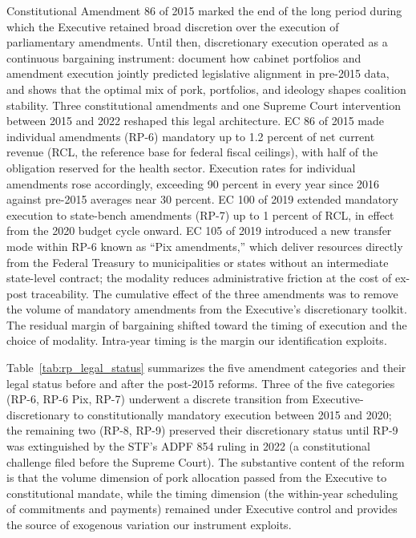 \documentclass[pdflatex,sn-basic]{sn-jnl}
\begin{document}
Constitutional Amendment 86 of 2015 marked the end of the long period during which the Executive retained broad discretion over the execution of parliamentary amendments. Until then, discretionary execution operated as a continuous bargaining instrument: \citet{PereiraAndMueller2004} document how cabinet portfolios and amendment execution jointly predicted legislative alignment in pre-2015 data, and \citet{Raile2011} shows that the optimal mix of pork, portfolios, and ideology shapes coalition stability. Three constitutional amendments and one Supreme Court intervention between 2015 and 2022 reshaped this legal architecture. EC 86 of 2015 made individual amendments (RP-6) mandatory up to 1.2 percent of net current revenue (RCL, the reference base for federal fiscal ceilings), with half of the obligation reserved for the health sector. Execution rates for individual amendments rose accordingly, exceeding 90 percent in every year since 2016 against pre-2015 averages near 30 percent. EC 100 of 2019 extended mandatory execution to state-bench amendments (RP-7) up to 1 percent of RCL, in effect from the 2020 budget cycle onward. EC 105 of 2019 introduced a new transfer mode within RP-6 known as ``Pix amendments,'' which deliver resources directly from the Federal Treasury to municipalities or states without an intermediate state-level contract; the modality reduces administrative friction at the cost of ex-post traceability. The cumulative effect of the three amendments was to remove the volume of mandatory amendments from the Executive's discretionary toolkit. The residual margin of bargaining shifted toward the timing of execution and the choice of modality. Intra-year timing is the margin our identification exploits.

Table~\ref{tab:rp_legal_status} summarizes the five amendment categories and their legal status before and after the post-2015 reforms. Three of the five categories (RP-6, RP-6 Pix, RP-7) underwent a discrete transition from Executive-discretionary to constitutionally mandatory execution between 2015 and 2020; the remaining two (RP-8, RP-9) preserved their discretionary status until RP-9 was extinguished by the STF's ADPF 854 ruling in 2022 (a constitutional challenge filed before the Supreme Court). The substantive content of the reform is that the volume dimension of pork allocation passed from the Executive to constitutional mandate, while the timing dimension (the within-year scheduling of commitments and payments) remained under Executive control and provides the source of exogenous variation our instrument exploits.
\end{document}
